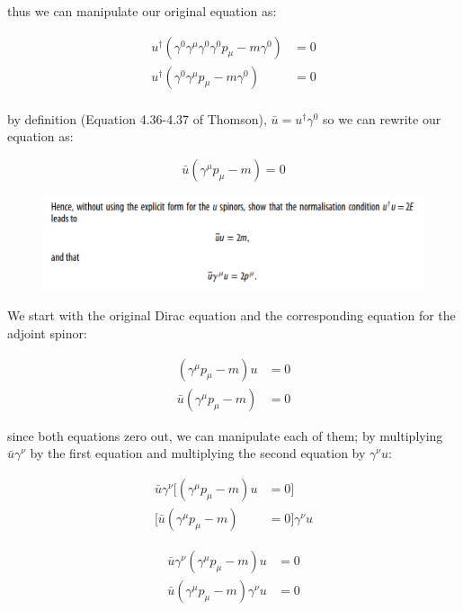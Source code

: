 \documentclass[11pt]{article}
\theoremstyle{definition}
\begin{document}
thus we can manipulate our original equation as:

\begin{align}
    u^{\dagger}(\gamma^{0} \gamma^{\mu} \gamma^{0}\gamma^{0} p_{\mu} - m\gamma^{0}) &= 0\\
    u^{\dagger}(\gamma^{0} \gamma^{\mu} p_{\mu} - m\gamma^{0}) &= 0\\
\end{align}

by definition (Equation 4.36-4.37 of Thomson), $\bar{u} = u^{\dagger}\gamma^{0}$ so we can rewrite our equation as:

\begin{equation}\label{adjoint dirac}
\boxed{
    \bar{u}(\gamma^{\mu}p_{\mu} - m) = 0
}
\end{equation}


\begin{figure}[h!]
    \centering
    \includegraphics[scale = 0.55]{4.9b.png}
\end{figure}

We start with the original Dirac equation and the corresponding equation for the adjoint spinor:

\begin{align}
    (\gamma^{\mu} p_{\mu} - m)u &= 0\\
    \bar{u}(\gamma^{\mu}p_{\mu} - m) &= 0
\end{align}

since both equations zero out, we can manipulate each of them; by multiplying $\bar{u}\gamma^{\nu}$ by the first equation and multiplying the second equation by $\gamma^{\nu}u$:

\begin{align}
    \bar{u}\gamma^{\nu}[(\gamma^{\mu} p_{\mu} - m)u &= 0]\\
    [\bar{u}(\gamma^{\mu}p_{\mu} - m) &= 0]\gamma^{\nu}u
\end{align}

\begin{align}
    \bar{u}\gamma^{\nu}(\gamma^{\mu} p_{\mu} - m)u &= 0\\
    \bar{u}(\gamma^{\mu}p_{\mu} - m)\gamma^{\nu}u &= 0
\end{align}
\end{document}
